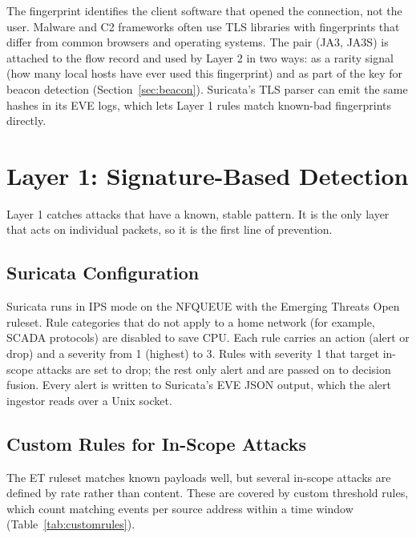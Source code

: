 \noindent The fingerprint identifies the client software that opened the connection, not the user. Malware and C2 frameworks often use TLS libraries with fingerprints that differ from common browsers and operating systems. The pair (JA3, JA3S) is attached to the flow record and used by Layer 2 in two ways: as a rarity signal (how many local hosts have ever used this fingerprint) and as part of the key for beacon detection (Section~\ref{sec:beacon}). Suricata's TLS parser can emit the same hashes in its EVE logs, which lets Layer 1 rules match known-bad fingerprints directly.

\section{Layer 1: Signature-Based Detection}\label{sec:5.4}
\label{sec:layer1}
\noindent Layer 1 catches attacks that have a known, stable pattern. It is the only layer that acts on individual packets, so it is the first line of prevention.

\subsection{Suricata Configuration}\label{sec:5.4.1}
\label{sec:suricata}
\noindent Suricata \cite{nidps:suricata} runs in IPS mode on the NFQUEUE with the Emerging Threats Open ruleset. Rule categories that do not apply to a home network (for example, SCADA protocols) are disabled to save CPU. Each rule carries an action (alert or drop) and a severity from 1 (highest) to 3. Rules with severity 1 that target in-scope attacks are set to drop; the rest only alert and are passed on to decision fusion. Every alert is written to Suricata's EVE JSON output, which the alert ingestor reads over a Unix socket.

\subsection{Custom Rules for In-Scope Attacks}\label{sec:5.4.2}
\label{sec:customrules}
\noindent The ET ruleset matches known payloads well, but several in-scope attacks are defined by rate rather than content. These are covered by custom threshold rules, which count matching events per source address within a time window (Table~\ref{tab:customrules}).

